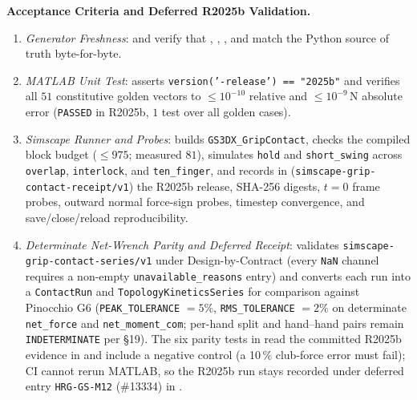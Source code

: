\documentclass[11pt,a4paper]{article}
\begin{document}
\textbf{Acceptance Criteria and Deferred R2025b Validation.}
\begin{enumerate}[leftmargin=*,noitemsep]
\item \textit{Generator Freshness}:  and  verify that , , , and  match the Python source of truth byte-for-byte.
\item \textit{MATLAB Unit Test}:  asserts \texttt{version('-release') == "2025b"} and verifies all $51$ constitutive golden vectors to $\le 10^{-10}$ relative and $\le 10^{-9}\,\mathrm{N}$ absolute error (\texttt{PASSED} in R2025b, $1$ test over all golden cases).
\item \textit{Simscape Runner and Probes}:  builds \texttt{GS3DX\_GripContact}, checks the compiled block budget ($\le 975$; measured $81$), simulates \texttt{hold} and \texttt{short\_swing} across \texttt{overlap}, \texttt{interlock}, and \texttt{ten\_finger}, and records in  (\texttt{simscape-grip-contact-receipt/v1}) the R2025b release, SHA-256 digests, $t=0$ frame probes, outward normal force-sign probes, timestep convergence, and save/close/reload reproducibility.
\item \textit{Determinate Net-Wrench Parity and Deferred Receipt}:  validates \texttt{simscape-grip-contact-series/v1} under Design-by-Contract (every \texttt{NaN} channel requires a non-empty \texttt{unavailable\_reasons} entry) and converts each run into a \texttt{ContactRun} and \texttt{TopologyKineticsSeries} for comparison against Pinocchio G6 (\texttt{PEAK\_TOLERANCE} $= 5\%$, \texttt{RMS\_TOLERANCE} $= 2\%$ on determinate \texttt{net\_force} and \texttt{net\_moment\_com}; per-hand split and hand--hand pairs remain \texttt{INDETERMINATE} per \S 19). The six parity tests in  read the committed R2025b evidence in  and include a negative control (a 10\,\% club-force error must fail); CI cannot rerun MATLAB, so the R2025b run stays recorded under deferred entry \texttt{HRG-GS-M12} (\#13334) in .
\end{enumerate}
\end{document}
